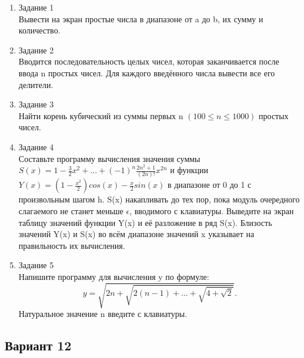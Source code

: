 \documentclass[a4paper]{article}
\begin{document}
	
	\begin{enumerate} 
		\item Задание 1 \\
		Вывести на экран простые числа в диапазоне от a до b, их сумму и количество.\\
		\item Задание 2\\
		Вводится последовательность целых чисел, которая заканчивается после ввода n простых чисел. Для каждого введённого числа вывести все его делители.\\
		\item Задание 3 \\
		Найти корень кубический из суммы первых  n $(100 \le n \le 1000) $ простых чисел.\\
		\item Задание 4 \\ 
		Составьте программу вычисления значения суммы  $S(x)=1-\frac{3}{2}{x^2}+...+(-1)^n\frac{2n^2+1}{(2n)!}{x^{2n}}$
		и функции $Y(x)=(1-\frac{x^2}{2})cos(x)-\frac{x}{2}sin(x)$ в диапазоне от 0 до 1
		с произвольным шагом h. S(x) накапливать до тех пор, пока модуль очередного слагаемого не станет меньше $\epsilon$, вводимого с клавиатуры.  Выведите на экран таблицу значений функции Y(x) и её разложение в ряд S(x). Близость значений Y(x) и S(x) во всём диапазоне значений x указывает на правильность их вычисления.\\
		\item Задание 5 \\
		Напишите программу для вычисления y по формуле:\\
		$$y=\sqrt{2n+\sqrt{2(n-1)+...+\sqrt{4+\sqrt{2}}}}.$$
		Натуральное значение n введите с клавиатуры. \\
		
	\end{enumerate}
\newpage
	\begin{center}
		\subsection*{Вариант 12}
	\end{center}
	
\end{document}
